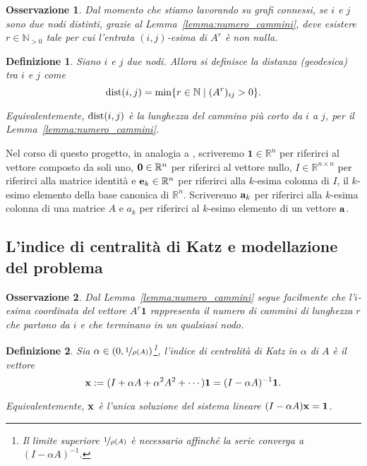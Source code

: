\documentclass[a4paper]{article}
\newcommand{\dist}{{\rm dist}}
\newcommand{\NN}{\mathbb{N}}
\newcommand{\NNp}{\mathbb{N}_{> 0}}
\newcommand{\RR}{\mathbb{R}}
\newcommand{\evec}{{\bf e}}
\newcommand{\avec}{{\bf a}}
\newcommand{\xvec}{{\bf x}}
\newcommand{\bone}{\mathbf{1}}
\newcommand{\bzero}{{\bf 0}}
\newcommand{\inv}{^{-1}}
\newtheorem{definition}{Definizione}
\newtheorem{remark}{Osservazione}
\begin{document}
\begin{remark}
	Dal momento che stiamo lavorando su grafi connessi, se $i$ e $j$ sono
	due nodi distinti, grazie al Lemma~\ref{lemma:numero_cammini}, deve
	esistere $r \in \NNp$ tale per cui l'entrata $(i,j)$-esima di $A^r$
	è non nulla.
	
\end{remark}

\begin{definition} \label{def:distanza} Siano $i$ e $j$
	due nodi. Allora si definisce la {\rm distanza (geodesica) tra $i$ e $j$} come
	\begin{equation}
		\dist(i, j) = \min \{r \in \NN \mid (A^r)_{ij} > 0\}.
	\end{equation}
	
	Equivalentemente, $\dist(i, j)$ è la lunghezza del cammino più corto
	da $i$ a $j$, per il Lemma~\ref{lemma:numero_cammini}.
\end{definition}

Nel corso di questo progetto, in analogia a \cite{katz2024}, scriveremo
$\bone \in \RR^n$ per riferirci al vettore composto da soli uno, $\bzero \in \RR^n$ per riferirci al vettore nullo, $I \in \RR^{n \times n}$ per riferirci
alla matrice identità e $\evec_k \in \RR^n$ per riferirci alla $k$-esima colonna di $I$, il $k$-esimo elemento della base canonica di $\RR^n$. Scriveremo $\avec_k$ per riferirci alla $k$-esima colonna di una matrice $A$ e $a_k$ per riferirci al $k$-esimo elemento di un vettore $\avec$.

\subsection{L'indice di centralità di Katz e modellazione del problema}

\begin{remark}
	\label{remark:molt_per_1}
	Dal Lemma~\ref{lemma:numero_cammini} segue facilmente che l'$i$-esima
	coordinata del vettore $A^r \bone$ rappresenta il numero di cammini
	di lunghezza $r$ che partono da $i$ e che terminano in un qualsiasi nodo.
\end{remark}

\begin{definition} Sia $\alpha \in (0, \nicefrac{1}{\rho(A)})$\footnote{Il limite superiore $\nicefrac{1}{\rho(A)}$ è necessario affinché la serie converga a $(I-\alpha A)\inv$.}, {\rm l'indice di centralità di Katz in $\alpha$ di $A$} è il vettore
	\[
		\xvec := (I + \alpha A + \alpha^2A^2+\cdots) \bone = (I-\alpha A)\inv \bone.
	\]
	
	Equivalentemente, $\xvec$ è l'unica soluzione del sistema lineare $(I-\alpha A)\xvec = \bone$.
\end{definition}
    
\end{document}

